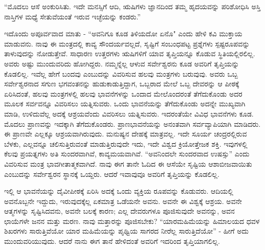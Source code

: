 “ಮೊದಲು ಆಸೆ ಅಂಕುರಿಸಿತು. ಇದೇ ಮನಸ್ಸಿಗೆ ಆದಿ, ಋಷಿಗಳು ಜ್ಞಾನದಿಂದ ತಮ್ಮ ಹೃದಯವನ್ನು ಪರಿಶೋಧಿಸಿ ಅಸ್ತಿ ನಾಸ್ತಿಗಳ ಮಧ್ಯೆ ಸೇತುವೆಯಂತೆ ಇರುವ ಇಚ್ಛೆಯನ್ನು ಕಂಡರು.”

ಇದೊಂದು ಅಪೂರ್ವವಾದ ಮಾತು - “ಅವನಿಗೂ ಕೂಡ ತಿಳಿಯದೋ ಏನೊ" ಎಂದು ಹೇಳಿ ಕವಿ ಮುಕ್ತಾಯ ಮಾಡುವನು. ನಾವು ಈ ಮಂತ್ರದಲ್ಲಿ ಕಾವ್ಯ ಸೌಂದರ್ಯವಲ್ಲದೆ, ಸೃಷ್ಟಿಗೆ ಸಂಬಂಧಪಟ್ಟ ಪ್ರಶ್ನೆಗಳು ಸ್ಪಷ್ಟರೂಪವನ್ನು ತಾಳುವುದನ್ನು ನೋಡುತ್ತೇವೆ. ಸಾಧಾರಣ ಉತ್ತರಗಳು ಋಷಿಗಳಿಗೆ ಯಾವ ತೃಪ್ತಿಯನ್ನೂ ಕೊಡುವ ಸ್ಥಿತಿಯಲ್ಲಿರಲಿಲ್ಲ. ಅವರು ಅಷ್ಟು ಮುಂದುವರಿದು ಹೋಗಿದ್ದರು. ನಮ್ಮನ್ನೆಲ್ಲ ಆಳುವ ಸರ್ವೇಶ್ವರನು ಕೂಡ ಅವರಿಗೆ ತೃಪ್ತಿಯನ್ನು ಕೊಡಲಿಲ್ಲ. ಇವೆಲ್ಲ ಹೇಗೆ ಬಂದವು ಎಂಬುದನ್ನು ವಿವರಿಸುವ ಹಲವು ಮಂತ್ರಗಳು ಬರುವುವು. ಅವರು ಒಬ್ಬ ಸರ್ವೇಶ್ವರನಾದ ಸಗುಣ ಭಗವಂತನನ್ನು ಹುಡುಕಾಡುತ್ತಿದ್ದಾಗ, ಒಬ್ಬರಾದ ಮೇಲೆ ಒಬ್ಬ ದೇವರನ್ನು ಆ ಪೀಠಕ್ಕೆ ಏರಿಸಿದಂತೆ, ಹಲವು ಮಂತ್ರಗಳಲ್ಲಿ ಹಲವು ಭಾವನೆಗಳನ್ನು ಒಂದಾದ ಮೇಲೊಂದರಂತೆ ತೆಗೆದುಕೊಂಡು ಅದರ ಮೂಲಕ ಸರ್ವವನ್ನೂ ವಿವರಿಸಲು ಯತ್ನಿಸುವರು. ಒಂದು ಭಾವನೆಯನ್ನು ತೆಗೆದುಕೊಂಡು ಅದನ್ನೇ ಮುಖ್ಯವಾಗಿ ಮಾಡಿ, ಉಳಿದುವೆಲ್ಲ ಅದಕ್ಕೆ ಆಶ್ರಯವೆಂದು ವಿವರಿಸಲು ಯತ್ನಿಸುವರು. ಇದರಂತೆಯೇ ವಿವಿಧ ಭಾವನೆಗಳು ಕೂಡ. ಮೊದಲು ಪ್ರಾಣವನ್ನು ಇದಕ್ಕಾಗಿ ತೆಗೆದುಕೊಂಡರು. ಪ್ರಾಣಭಾವನೆಯನ್ನು ಅನಂತವಾಗಿ ಸರ್ವವ್ಯಾಪಿಯಾಗಿ ಮಾಡಿದರು. ಈ ಪ್ರಾಣವೇ ಎಲ್ಲಕ್ಕೂ ಆಶ್ರಯವಾಗಿರುವುದು. ಮನುಷ್ಯನ ದೇಹಕ್ಕೆ ಮಾತ್ರವಲ್ಲ. ಇದೇ ಸೂರ್ಯ ಚಂದ್ರರಲ್ಲಿರುವ ಬೆಳಕು, ಎಲ್ಲವನ್ನೂ ಚಲಿಸುತ್ತಿರುವಂತೆ ಮಾಡುತ್ತಿರುವುದೇ ಇದು, ಇದೇ ವಿಶ್ವದ ಕ್ರಿಯೋತ್ತೇಜಕ ಶಕ್ತಿ. ಇವುಗಳಲ್ಲಿ ಕೆಲವು ಪ್ರಯತ್ನಗಳು ಅತಿ ಸುಂದರವಾಗಿವೆ, ಕಾವ್ಯಮಯವಾಗಿವೆ. “ಅವನಿಂದಲೇ ಸುಂದರವಾದ ಉಷಸ್ಸು” ಎಂದು ವಿವರಿಸುವ ಮಂತ್ರ ಭಾವಗೀತಾತ್ಮಕವಾಗಿದೆ. ನಾವು ಈಗ ತಾನೇ ಓದಿದ ಈ ಆಸೆಯೇ ಸೃಷ್ಟಿಯ ಆಶಾಬೀಜವಾಯಿತು ಎಂಬುದನ್ನು ಸರ್ವೇಶ್ವರನ ಸ್ಥಾನಕ್ಕೆ ಒಯ್ದರು. ಆದರೆ ಇವಾವುವೂ ಅವರಿಗೆ ತೃಪ್ತಿಯನ್ನು ಕೊಡಲಿಲ್ಲ.

ಇಲ್ಲಿ ಆ ಭಾವನೆಯನ್ನು ದೈವೀಪೀಠಕ್ಕೆ ಏರಿಸಿ ಅದಕ್ಕೆ ಒಂದು ವ್ಯಕ್ತಿಯ ರೂಪವನ್ನು ಕೊಡುವರು. ಆದಿಯಲ್ಲಿ ಅವನೊಬ್ಬನೇ ಇದ್ದುದು, ಇರುವುದಕ್ಕೆಲ್ಲ ಏಕಮಾತ್ರ ಒಡೆಯನೇ ಅವನು. ಅವನೇ ಈ ವಿಶ್ವಕ್ಕೆ ಆಶ್ರಯ. ಅವನೇ ಆತ್ಮಗಳನ್ನು ಸೃಷ್ಟಿಸಿದವನು, ಅವನೇ ಬಲಕ್ಕೆ ಕಾರಣ; ಎಲ್ಲ ದೇವರುಗಳೂ ಪೂಜಿಸುವುದೇ ಅವನನ್ನು, ಅವನ ಛಾಯೆಗಳೇ ಜನನ ಮತ್ತು ಮರಣ. ನಾವು ಮತ್ತಾರನ್ನು ಪೂಜಿಸಬೇಕು? “ಯಾರ\break ಮಹಿಮೆಯನ್ನು ಹಿಮಾಲಯದ ಧವಳ ಶಿಖರಗಳು ಸಾರುತ್ತಿವೆಯೋ ಯಾರ ಮಹಿಮೆಯನ್ನು ಪೃಥ್ವಿಯ ಸಾಗರದ ನೀರೆಲ್ಲ ಸಾರುತ್ತಿದೆಯೋ'' - ಹೀಗೆ ಅದು ಮುಂದುವರಿಯುವುದು. ಆದರೆ ನಾನು ಈಗ ತಾನೆ ಹೇಳಿದಂತೆ ಅವರಿಗೆ ಇದರಿಂದ ತೃಪ್ತಿಯಾಗಲಿಲ್ಲ.

